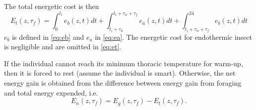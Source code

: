The total energetic cost is then
\begin{equation} \label{eq:et}
	E_t(z, \tau_f) = \int_0^{t_i} e_b(z, t) dt + \int_{t_i + \tau_w}^{t_i +\tau_w + \tau_f} e_a(z,t) dt + \int_{t_i+\tau_w+\tau_f}^24 e_b(z, t) dt 
\end{equation}
$e_b$ is defined in \cref{eq:eb}  and $e_a$ in \cref{eq:ea}.
The energetic cost for endothermic insect is negligible and are omitted in \cref{eq:et}.

If the individual cannot reach its minimum thoracic temperature for warm-up, then it is forced to rest (assume the individual is smart).
Otherwise, the net energy gain is obtained from the  difference between energy gain from foraging and total energy expended, i.e.
\[ 
	E_n(z, \tau_f) = E_g(z,\tau_f) - E_t(z, \tau_f).
\]


